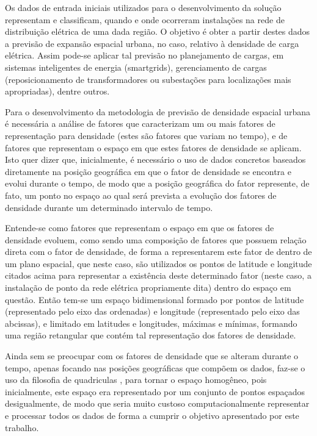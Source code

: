 Os dados de entrada iniciais utilizados para o desenvolvimento da solução representam e classificam, quando e onde ocorreram instalações na rede de distribuição elétrica de uma dada região. O objetivo é obter a partir destes dados a previsão de expansão espacial urbana, no caso, relativo à densidade de carga elétrica. Assim pode-se aplicar tal previsão no planejamento de cargas, em sistemas inteligentes de energia (smartgrids), gerenciamento de cargas (reposicionamento de transformadores ou subestações para localizações mais apropriadas), dentre outros. 

Para o desenvolvimento da metodologia de previsão de densidade espacial urbana é necessária a análise de fatores que caracterizam um ou mais fatores de representação para densidade (estes são fatores que variam no tempo), e de fatores que representam o espaço em que estes fatores de densidade se aplicam. Isto quer dizer que, inicialmente, é necessário o uso de dados concretos baseados diretamente na posição geográfica em que o fator de densidade se encontra e evolui durante o tempo, de modo que a posição geográfica do fator represente, de fato, um ponto no espaço ao qual será prevista a evolução dos fatores de densidade durante um determinado intervalo de tempo.

Entende-se como fatores que representam o espaço em que os fatores de densidade evoluem, como sendo uma composição de fatores que possuem relação direta com o fator de densidade, de forma a representarem este fator de dentro de um plano espacial, que neste caso, são utilizados os pontos de latitude e longitude citados acima para representar a existência deste determinado fator (neste caso, a instalação de ponto da rede elétrica propriamente dita) dentro do espaço em questão. Então tem-se um espaço bidimensional formado por pontos de latitude (representado pelo eixo das ordenadas) e longitude (representado pelo eixo das abcissas), e limitado em latitudes e longitudes, máximas e mínimas, formando uma região retangular que contém tal representação dos fatores de densidade.

Ainda sem se preocupar com os fatores de densidade que se alteram durante o tempo, apenas focando nas posições geográficas que compõem os dados, faz-se o uso da filosofia de quadriculas \cite{willis2002spatial}, para tornar o espaço homogêneo, pois inicialmente, este espaço era representado por um conjunto de pontos espaçados desigualmente, de modo que seria muito custoso computacionalmente representar e processar todos os dados de forma a cumprir o objetivo apresentado por este trabalho.

